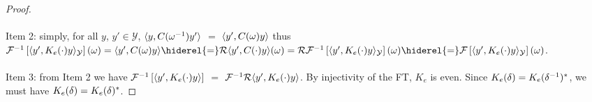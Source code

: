 \begin{proof}
    \paragraph{}
    Item 2: simply, for all $y$, $y'\in\mathcal{Y}$, $\langle y,
    C({\omega}^{-1})y'\rangle$ $=$ $\langle y', C(\omega)y\rangle$ thus $\IFT{\inner{y',
    K_e(\cdot)y}_{\mathcal{Y}}}(\omega)=\inner{y',
    C(\omega)y}\hiderel{=}\mathcal{R}\inner{y',
    C(\cdot)y}(\omega)=\mathcal{R}\IFT{\inner{y',
    K_e(\cdot)y}_{\mathcal{Y}}}(\omega) \hiderel{=} \FT{\inner{y',
    K_e(\cdot)y}_{\mathcal{Y}}}(\omega)$.
    \paragraph{}
    Item 3: from Item 2 we have
    $\mathcal{F}^{-1}\left[\langle y', K_e(\cdot)y\rangle\right]$ $=$ $\mathcal{F}^{-1}\mathcal{R}{\langle y',
    K_e(\cdot)y\rangle}$. By injectivity of the \acl{FT}, $K_e$ is even. Since
    $K_e(\delta)=K_e({\delta}^{-1})^* $, we must have
    $K_e(\delta)=K_e(\delta)^* $.
\end{proof}

